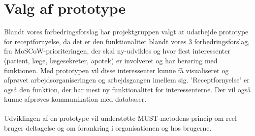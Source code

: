 \section{Valg af prototype}
Blandt vores forbedringsforslag har projektgruppen valgt at udarbejde prototype for receptfornyelse, da det er den funktionalitet blandt vores 3 forbedringsforslag, fra MoSCoW-prioriteringen, der skal ny-udvikles og hvor flest interessenter (patient, læge, lægesekreter, apotek) er involveret og har berøring med funktionen. Med prototypen vil disse interessenter kunne få visualiseret og afprøvet arbejdsorganiseringen og arbejdsgangen imellem sig. ’Receptfornyelse’ er også den funktion, der har mest ny funktionalitet for interessenterne. 
Der vil også kunne afprøves kommunikation med databaser. \\ 
\\
Udviklingen af en prototype vil understøtte MUST-metodens princip om reel bruger deltagelse og om forankring i organisationen og hos brugerne.
%
%
